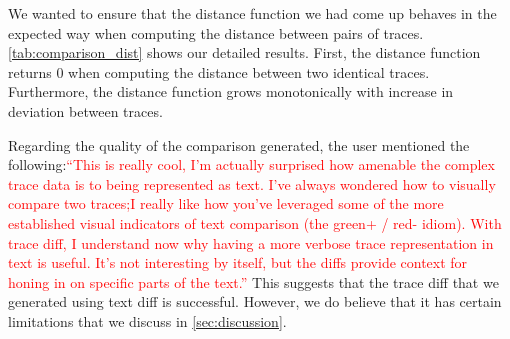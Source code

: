  We wanted to ensure that the distance function we had come up behaves in the expected way
when computing the distance between pairs of traces. \autoref{tab:comparison_dist} shows our detailed results. First,
the distance function returns 0 when computing the distance between two identical traces. Furthermore, the distance function
grows monotonically with increase in deviation between traces. 

 Regarding the quality of the comparison generated, the user mentioned the following:\textcolor{red}{``This is really cool, I'm actually 
surprised how amenable the complex trace data is to being represented as text.  I've always wondered how to visually compare two traces;I 
really like how you've leveraged some of the more established visual indicators of text comparison (the green+ / red- idiom). With trace diff,
I understand now why having a more verbose trace representation in text is useful.  It's not interesting by itself, but the diffs provide 
context for honing in on specific parts of the text.''} This suggests that the trace diff that we generated using text diff is successful.
However, we do believe that it has certain limitations that we discuss in \autoref{sec:discussion}.

